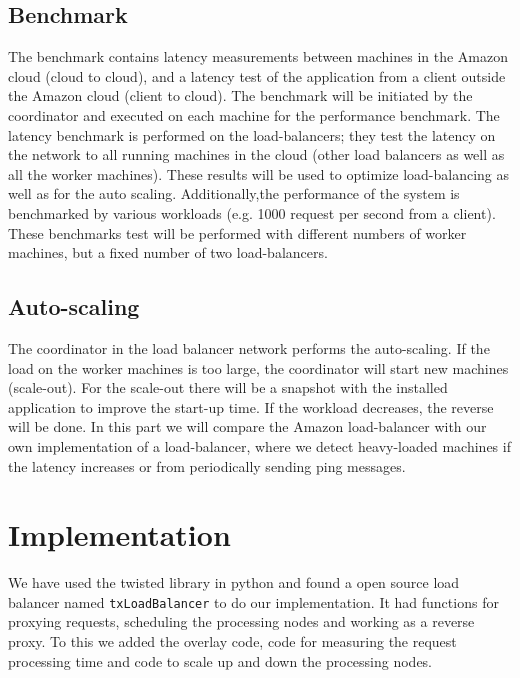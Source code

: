\documentclass[paper=a4, fontsize=11pt]{scrartcl} %
\numberwithin{equation}{section} %
\numberwithin{figure}{section} %
\numberwithin{table}{section} %
\begin{document}
\subsection{Benchmark}

The benchmark contains latency measurements between machines in the Amazon cloud (cloud to cloud), and a latency test of the application from a client outside the Amazon cloud (client to cloud). The benchmark will be initiated by the coordinator and executed on each machine for the performance benchmark. The latency benchmark is performed on the load-balancers; they test the latency on the network to all running machines in the cloud (other load balancers as well as all the worker machines). These results will be used to optimize load-balancing as well as for the auto scaling.
Additionally,the performance of the system is benchmarked by various workloads (e.g. 1000 request per second from a client). These benchmarks test will be performed with different numbers of worker machines, but a fixed number of two load-balancers.

\subsection{Auto-scaling}

The coordinator in the load balancer network performs the auto-scaling. If the load on the worker machines is too large, the coordinator will start new machines (scale-out). For the scale-out there will be a snapshot with the installed application to improve the start-up time. 
If the workload decreases, the reverse will be done.
In this part we will compare the Amazon load-balancer with our own implementation of a load-balancer, where we detect heavy-loaded machines if the latency increases or from periodically sending ping messages.

\section{Implementation}

We have used the twisted library in python and found a open source load balancer named \verb|txLoadBalancer| to do our implementation. It had functions for proxying requests, scheduling the processing nodes and working as a reverse proxy. To this we added the overlay code, code for measuring the request processing time and code to scale up and down the processing nodes.
\end{document}
